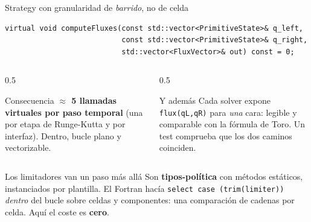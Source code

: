 \documentclass[aspectratio=169,10pt]{beamer}
\newcommand{\cod}[1]{\texttt{\small #1}}
\begin{document}
\begin{frame}[fragile]{Strategy con granularidad de \emph{barrido}, no de celda}

  \begin{lstlisting}
virtual void computeFluxes(const std::vector<PrimitiveState>& q_left,
                           const std::vector<PrimitiveState>& q_right,
                           std::vector<FluxVector>& out) const = 0;
  \end{lstlisting}

  \begin{columns}[t]
    \begin{column}{0.5\textwidth}
      \begin{block}{Consecuencia}
        \small
        \textbf{$\approx$ 5 llamadas virtuales por paso temporal} (una por etapa
        de Runge-Kutta y por interfaz). Dentro, bucle plano y vectorizable.
      \end{block}
    \end{column}
    \begin{column}{0.5\textwidth}
      \begin{block}{Y además}
        \small
        Cada solver expone \cod{flux(qL,qR)} para \emph{una} cara: legible y
        comparable con la fórmula de Toro. Un test comprueba que los dos caminos
        coinciden.
      \end{block}
    \end{column}
  \end{columns}

  \begin{exampleblock}{Los limitadores van un paso más allá}
    \small
    Son \textbf{tipos-política} con métodos estáticos, instanciados por plantilla.
    El Fortran hacía \cod{select case (trim(limiter))} \emph{dentro} del bucle
    sobre celdas y componentes: una comparación de cadenas por celda. Aquí el
    coste es \textbf{cero}.
  \end{exampleblock}
\end{frame}
\end{document}
